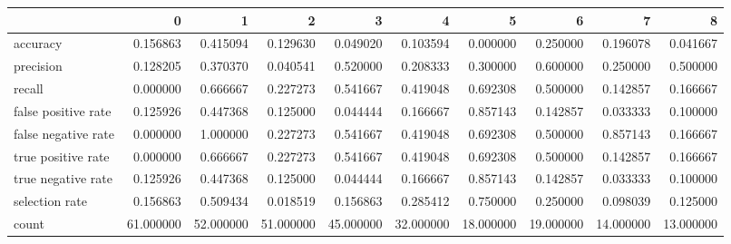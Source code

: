 \begin{tabular}{lrrrrrrrrr}
\toprule
{} &          0 &          1 &          2 &          3 &          4 &          5 &          6 &          7 &          8 \\
\midrule
accuracy            &   0.156863 &   0.415094 &   0.129630 &   0.049020 &   0.103594 &   0.000000 &   0.250000 &   0.196078 &   0.041667 \\
precision           &   0.128205 &   0.370370 &   0.040541 &   0.520000 &   0.208333 &   0.300000 &   0.600000 &   0.250000 &   0.500000 \\
recall              &   0.000000 &   0.666667 &   0.227273 &   0.541667 &   0.419048 &   0.692308 &   0.500000 &   0.142857 &   0.166667 \\
false positive rate &   0.125926 &   0.447368 &   0.125000 &   0.044444 &   0.166667 &   0.857143 &   0.142857 &   0.033333 &   0.100000 \\
false negative rate &   0.000000 &   1.000000 &   0.227273 &   0.541667 &   0.419048 &   0.692308 &   0.500000 &   0.857143 &   0.166667 \\
true positive rate  &   0.000000 &   0.666667 &   0.227273 &   0.541667 &   0.419048 &   0.692308 &   0.500000 &   0.142857 &   0.166667 \\
true negative rate  &   0.125926 &   0.447368 &   0.125000 &   0.044444 &   0.166667 &   0.857143 &   0.142857 &   0.033333 &   0.100000 \\
selection rate      &   0.156863 &   0.509434 &   0.018519 &   0.156863 &   0.285412 &   0.750000 &   0.250000 &   0.098039 &   0.125000 \\
count               &  61.000000 &  52.000000 &  51.000000 &  45.000000 &  32.000000 &  18.000000 &  19.000000 &  14.000000 &  13.000000 \\
\bottomrule
\end{tabular}
